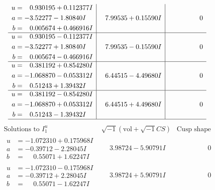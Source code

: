 \documentclass[1p]{elsarticle_modified}
\theoremstyle{definition}
\newcommand{\I}{\sqrt{-1}}
\begin{document}
$$\begin{array}{c|c|c}
\begin{aligned}
u &= \phantom{-}0.930195 + 0.112377 I \\
a &= -3.52277 - 1.80840 I \\
b &= \phantom{-}0.005674 + 0.466916 I\end{aligned}
 & \phantom{-}7.99535 + 0.15590 I & \phantom{-0.000000 } 0 \\ \hline\begin{aligned}
u &= \phantom{-}0.930195 - 0.112377 I \\
a &= -3.52277 + 1.80840 I \\
b &= \phantom{-}0.005674 - 0.466916 I\end{aligned}
 & \phantom{-}7.99535 - 0.15590 I & \phantom{-0.000000 } 0 \\ \hline\begin{aligned}
u &= \phantom{-}0.381192 + 0.854280 I \\
a &= -1.068870 - 0.053312 I \\
b &= \phantom{-}0.51243 + 1.39432 I\end{aligned}
 & \phantom{-}6.44515 - 4.49680 I & \phantom{-0.000000 } 0 \\ \hline\begin{aligned}
u &= \phantom{-}0.381192 - 0.854280 I \\
a &= -1.068870 + 0.053312 I \\
b &= \phantom{-}0.51243 - 1.39432 I\end{aligned}
 & \phantom{-}6.44515 + 4.49680 I & \phantom{-0.000000 } 0\\
 \hline 
 \end{array}$$\newpage$$\begin{array}{c|c|c}  
\text{Solutions to }I^u_{1}& \I (\text{vol} + \sqrt{-1}CS) & \text{Cusp shape}\\
 \hline 
\begin{aligned}
u &= -1.072310 + 0.175968 I \\
a &= -0.39712 - 2.28045 I \\
b &= \phantom{-}0.55071 + 1.62247 I\end{aligned}
 & \phantom{-}3.98724 - 5.90791 I & \phantom{-0.000000 } 0 \\ \hline\begin{aligned}
u &= -1.072310 - 0.175968 I \\
a &= -0.39712 + 2.28045 I \\
b &= \phantom{-}0.55071 - 1.62247 I\end{aligned}
 & \phantom{-}3.98724 + 5.90791 I & \phantom{-0.000000 } 0 \\ \hline\begin{aligned}

\end{aligned}
\end{array}$$
\end{document}
